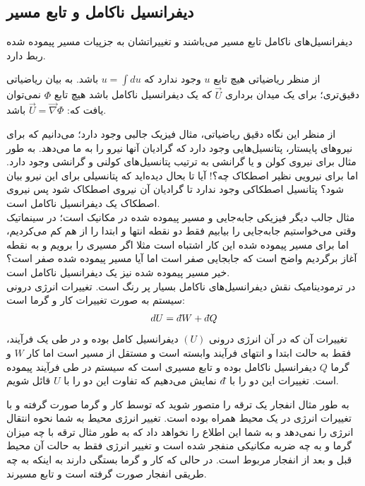 \documentclass[12pt,a4paper]{article}							   %
\newcommand{\dbar}{d\hspace*{-0.08em}\bar{}\hspace*{0.1em}}		   %
\begin{document}
\subsection{دیفرانسیل ناکامل و تابع مسیر
}
دیفرانسیل‌های ناکامل تابع مسیر می‌باشند و تغییراتشان به جزپیات مسیر پیموده شده ربط دارد.
\par
از منظر ریاضیاتی هیچ تابع
$ u $
وجود ندارد که
$ u=\int du $
باشد. به بیان ریاضیاتی دقیق‌تری؛ برای یک میدان برداری
$ \overrightarrow{U} $
که یک دیفرانسیل ناکامل باشد هیچ تابع
$ \Phi$
نمی‌توان یافت که:
$ \overrightarrow{U}=\overrightarrow{\nabla}\Phi  $
باشد.
\\
\par
از منظر این نگاه دقیق ریاضیاتی، مثال فیزیک جالبی وجود دارد؛ می‌دانیم که برای نیروهای پایستار، پتانسیل‌هایی وجود دارد که گرادیان آنها نیرو را به ما می‌دهد. به طور مثال برای نیروی کولن و یا گرانشی به ترتیب پتانسیل‌های کولنی و گرانشی وجود دارد. اما برای نیرویی نظیر اصطکاک چه؟! آیا تا بحال دیده‌اید که پتانسیلی برای این نیرو بیان شود؟ پتانسیل اصطکاکی وجود ندارد تا گرادیان آن نیروی اصطکاک شود پس نیروی اصطکاک یک دیفرانسیل ناکامل است.
\\
مثال جالب دیگر فیزیکی جابه‌جایی و مسیر پیموده شده در مکانیک است؛ در سینماتیک وقتی می‌خواستیم جابه‌جایی را بیابیم فقط دو نقطه انتها و ابتدا را از هم کم می‌کردیم، اما برای مسیر پیموده شده این کار اشتباه است مثلا اگر مسیری را برویم و به نقطه آغاز برگردیم واضح است که جابجایی صفر است اما آیا مسیر پیموده شده صفر است؟ خیر مسیر  پیموده شده نیز یک دیفرانسیل ناکامل است.
\\
در ترمودینامیک نقش دیفرانسیل‌های ناکامل بسیار پر رنگ است. تغییرات انرژی درونی سیستم به صورت تغییرات کار و گرما است:
\begin{align*}
dU=\dbar W+\dbar Q
\end{align*}
که در آن انرژی درونی
$ (U) $
دیفرانسیل کامل بوده و در طی یک فرآیند‫‪،‬‬ تغییرات آن فقط به حالت ابتدا و انتهای فرآیند وابسته است و مستقل از مسیر است اما
کار
$ W $
و گرما
$ Q $
دیفرانسیل ناکامل بوده و تابع مسیری است که سیستم در طی فرآیند پیموده است. تغییرات این دو را با
$\dbar$
نمایش می‌دهیم که تفاوت این دو را با
$U$
قائل شویم.
\\
\par
به طور مثال انفجار یک ترقه را متصور شوید که توسط کار و گرما صورت گرفته و با تغییرات انرژی در یک محیط همراه بوده است. تغییر انرژی محیط به شما نحوه انتقال انرژی را نمی‌دهد و به شما این اطلاع را نخواهد داد که به طور مثال ترقه با چه میزان گرما و به چه ضربه مکانیکی منفجر شده است و تغییر انرژی فقط به حالت آن محیط قبل و بعد از انفجار مربوط است. در حالی که کار و گرما بستگی دارند به اینکه به چه طریقی انفجار صورت گرفته است و تابع مسیرند.
\newpage
\end{document}
